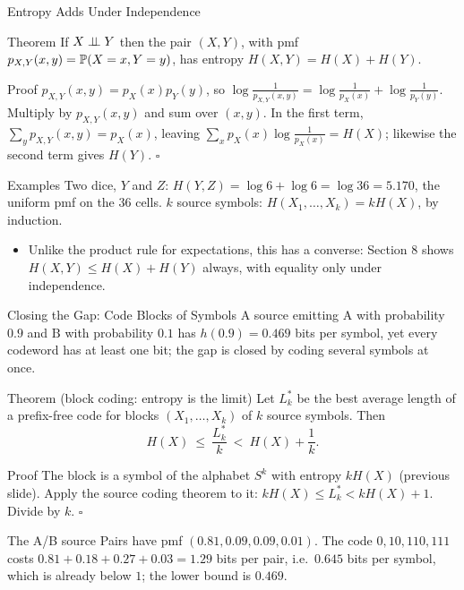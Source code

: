 \begin{frame}{Entropy Adds Under Independence}
  \small
  \begin{block}{Theorem}
    If $X\perp\!\!\!\perp Y$ then the pair $(X,Y)$, with pmf $p_{X,Y}(x,y)=\mathbb{P}(X=x,Y=y)$, has entropy $H(X,Y)=H(X)+H(Y)$.
  \end{block}
  \begin{block}{Proof}
    $p_{X,Y}(x,y)=p_X(x)p_Y(y)$, so $\log\frac1{p_{X,Y}(x,y)}=\log\frac1{p_X(x)}+\log\frac1{p_Y(y)}$. Multiply by $p_{X,Y}(x,y)$ and sum over $(x,y)$.
    In the first term, $\sum_yp_{X,Y}(x,y)=p_X(x)$, leaving $\sum_xp_X(x)\log\frac1{p_X(x)}=H(X)$; likewise the second term gives $H(Y)$. \hfill$\square$
  \end{block}
  \begin{exampleblock}{Examples}
    Two dice, $Y$ and $Z$: $H(Y,Z)=\log6+\log6=\log36=5.170$, the uniform pmf on the $36$ cells. \quad
    $k$ source symbols: $H(X_1,\dots,X_k)=kH(X)$, by induction.
  \end{exampleblock}
  \begin{itemize}
    \item Unlike the product rule for expectations, this has a converse: Section 8 shows $H(X,Y)\le H(X)+H(Y)$ always, with equality only under independence.
  \end{itemize}
\end{frame}

\begin{frame}{Closing the Gap: Code Blocks of Symbols}
  \small
  A source emitting $\mathrm A$ with probability $0.9$ and $\mathrm B$ with probability $0.1$ has $h(0.9)=0.469$ bits per symbol, yet every codeword has at least one bit; the gap is closed by coding several symbols at once.
  \begin{block}{Theorem (block coding: entropy is the limit)}
    Let $L^*_k$ be the best average length of a prefix-free code for blocks $(X_1,\dots,X_k)$ of $k$ source symbols. Then
    \[
      H(X)\ \le\ \frac{L^*_k}{k}\ <\ H(X)+\frac1k .
    \]
  \end{block}
  \begin{block}{Proof}
    The block is a symbol of the alphabet $S^k$ with entropy $kH(X)$ (previous slide). Apply the source coding theorem to it: $kH(X)\le L^*_k<kH(X)+1$. Divide by $k$. \hfill$\square$
  \end{block}
  \begin{exampleblock}{The A/B source}
    Pairs have pmf $(0.81,0.09,0.09,0.01)$. The code $0,10,110,111$ costs $0.81+0.18+0.27+0.03=1.29$ bits per pair, i.e.\ $0.645$ bits per symbol, which is already below $1$; the lower bound is $0.469$.
  \end{exampleblock}
\end{frame}

